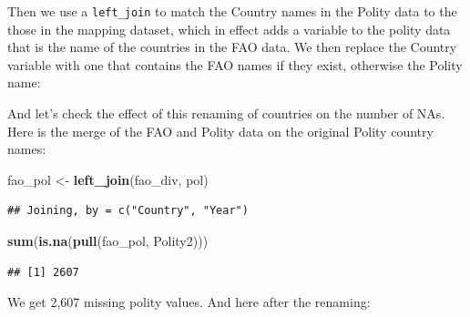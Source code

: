 \documentclass[]{book}
\newenvironment{Shaded}{\begin{snugshade}}{\end{snugshade}}
\newcommand{\CommentTok}[1]{\textcolor[rgb]{0.56,0.35,0.01}{\textit{#1}}}
\newcommand{\DataTypeTok}[1]{\textcolor[rgb]{0.13,0.29,0.53}{#1}}
\newcommand{\KeywordTok}[1]{\textcolor[rgb]{0.13,0.29,0.53}{\textbf{#1}}}
\newcommand{\NormalTok}[1]{#1}
\newcommand{\OperatorTok}[1]{\textcolor[rgb]{0.81,0.36,0.00}{\textbf{#1}}}
\newcommand{\StringTok}[1]{\textcolor[rgb]{0.31,0.60,0.02}{#1}}
\begin{document}
Then we use a \texttt{left\_join} to match the Country names in the Polity data to the those in the mapping dataset, which in effect adds a variable to the polity data that is the name of the countries in the FAO data. We then replace the Country variable with one that contains the FAO names if they exist, otherwise the Polity name:

\begin{Shaded}
\end{Shaded}

And let's check the effect of this renaming of countries on the number of NAs. Here is the merge of the FAO and Polity data on the original Polity country names:

\begin{Shaded}
\begin{Highlighting}[]
\NormalTok{fao_pol <-}\StringTok{ }\KeywordTok{left_join}\NormalTok{(fao_div, pol)}
\end{Highlighting}
\end{Shaded}

\begin{verbatim}
## Joining, by = c("Country", "Year")
\end{verbatim}

\begin{Shaded}
\begin{Highlighting}[]
\KeywordTok{sum}\NormalTok{(}\KeywordTok{is.na}\NormalTok{(}\KeywordTok{pull}\NormalTok{(fao_pol, Polity2)))}
\end{Highlighting}
\end{Shaded}

\begin{verbatim}
## [1] 2607
\end{verbatim}

We get 2,607 missing polity values. And here after the renaming:
\end{document}
